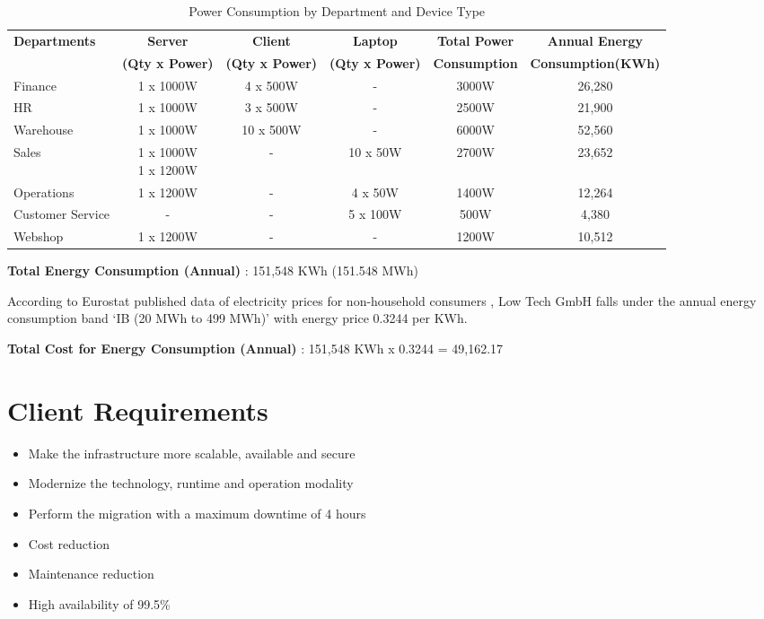 \documentclass{llncs}
\begin{document}
\begin{table}[htbp]
\centering
\begin{tabular}{|l|c|c|c|c|c|}
\hline
\textbf{Departments} & \textbf{Server} & \textbf{Client} & \textbf{Laptop} & \textbf{Total Power} & \textbf{Annual Energy}  \\
 & \textbf{ (Qty x Power) } & \textbf{ (Qty x Power) } & \textbf{ (Qty x Power) } & \textbf{ Consumption } & \textbf{ Consumption(KWh) } \\
\hline
Finance & 1 x 1000W & 4 x 500W & - & 3000W & 26,280 \\
\hline
HR & 1 x 1000W & 3 x 500W & - & 2500W & 21,900 \\
\hline
Warehouse & 1 x 1000W & 10 x 500W & - & 6000W & 52,560 \\
\hline
Sales & \makecell{1 x 1000W \\ 1 x 1200W} & - & 10 x 50W & 2700W & 23,652 \\
\hline
Operations & 1 x 1200W & - & 4 x 50W & 1400W & 12,264\\
\hline
Customer Service & - & - & 5 x 100W & 500W & 4,380 \\
\hline
Webshop & 1 x 1200W & - & - & 1200W & 10,512\\
\hline
\end{tabular}
\caption{Power Consumption by Department and Device Type}
\label{tab:power_consumption}
\end{table}

\textbf{Total Energy Consumption (Annual)} : 151,548 KWh (151.548 MWh)

According to Eurostat published data of electricity prices for non-household consumers \cite{eurostat2023}, Low Tech GmbH falls under the annual energy consumption band 
`IB (20 MWh to 499 MWh)' with energy price 0.3244 \EUR{} per KWh.


\textbf{Total Cost for Energy Consumption (Annual)} : 151,548 KWh x 0.3244 \EUR{} = 49,162.17 \EUR{}


\section{Client Requirements}

\begin{itemize}
  \item Make the infrastructure more scalable, available and secure
  \item Modernize the technology, runtime and operation modality
  \item Perform the migration with a maximum downtime of 4 hours
  \item Cost reduction
  \item Maintenance reduction
  \item High availability of 99.5\%
\end{itemize}
\end{document}
